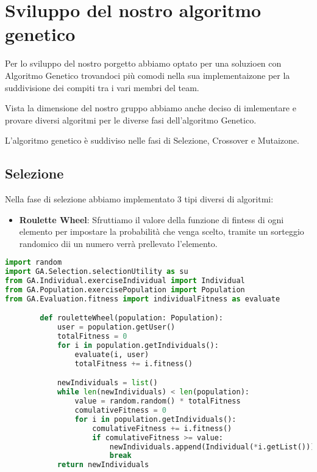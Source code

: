 \documentclass{article}
\begin{document}
\pagebreak


\section{Sviluppo del nostro algoritmo genetico}

Per lo sviluppo del nostro porgetto abbiamo optato per una soluzioen con Algoritmo Genetico trovandoci più comodi nella sua implementaizone per la suddivisione dei compiti tra i vari membri del team.

Vista la dimensione del nostro gruppo abbiamo anche deciso di imlementare e provare diversi algoritmi per le diverse fasi dell'algoritmo Genetico.

L'algoritmo genetico è suddiviso nelle fasi di Selezione, Crossover e Mutaizone.

\subsection{Selezione}

Nella fase di selezione abbiamo implementato 3 tipi diversi di algoritmi:

\begin{itemize}
\item\textbf{Roulette Wheel}: Sfruttiamo il valore della funzione di fintess di ogni elemento per impostare la probabilità che venga scelto, tramite un sorteggio randomico dii un numero verrà prellevato l'elemento.
\end{itemize}

\begin{lstlisting}[language=Python, breaklines, no caption]
import random
import GA.Selection.selectionUtility as su
from GA.Individual.exerciseIndividual import Individual
from GA.Population.exercisePopulation import Population
from GA.Evaluation.fitness import individualFitness as evaluate

        def rouletteWheel(population: Population):
            user = population.getUser()
            totalFitness = 0
            for i in population.getIndividuals():
                evaluate(i, user)
                totalFitness += i.fitness()

            newIndividuals = list()
            while len(newIndividuals) < len(population):
                value = random.random() * totalFitness
                comulativeFitness = 0
                for i in population.getIndividuals():
                    comulativeFitness += i.fitness()
                    if comulativeFitness >= value:
                        newIndividuals.append(Individual(*i.getList()))
                        break
            return newIndividuals
\end{lstlisting}
\end{document}
